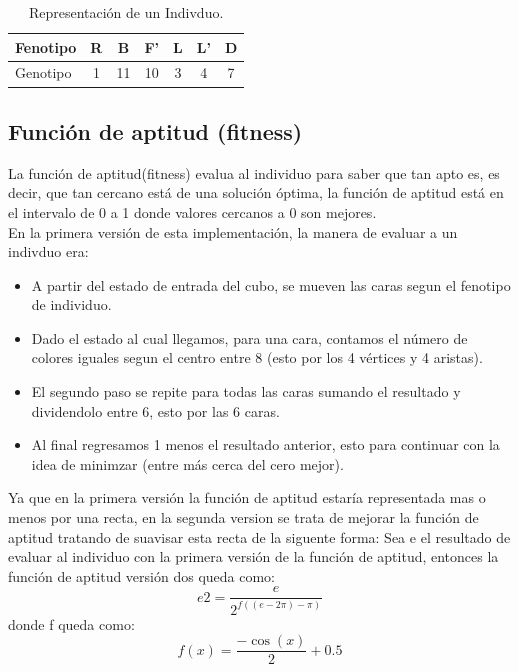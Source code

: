 \documentclass[oneside,10pt]{article}
\begin{document}
\begin{table}[htbp]
\begin{center}
\begin{tabular}{|l|c|c|c|c|c|c|}
\hline
Fenotipo & R & B & F' & L & L'& D\\
\hline
Genotipo & 1 & 11 & 10 & 3 & 4 & 7\\
\hline
\end{tabular}
\caption{Representaci\'on de un Indivduo.}
\label{tabla:individuo}
\end{center}
\end{table}

\subsection{Funci\'on de aptitud (fitness)}
La funci\'on de aptitud(fitness) evalua al individuo para saber que tan apto es, es decir, que tan cercano est\'a de una soluci\'on \'optima, la funci\'on de aptitud est\'a en el intervalo de 0 a 1 donde valores cercanos a 0 son mejores.\\

En la primera versi\'on de esta implementaci\'on, la manera de evaluar a un indivduo era:
\begin{itemize}
    \item A partir del estado de entrada del cubo, se mueven las caras segun el fenotipo de individuo. 
    \item Dado el estado al cual llegamos, para una cara,  contamos el n\'umero de colores iguales segun el centro entre 8 (esto por los 4 v\'ertices y 4 aristas).
    \item El segundo paso se repite para todas las caras sumando el resultado y dividendolo entre 6, esto por las 6 caras.
    \item Al final regresamos 1 menos el resultado anterior, esto para continuar con la idea de minimzar (entre m\'as cerca del cero mejor).
    
\end{itemize}


Ya que en la primera versi\'on la funci\'on de aptitud estar\'ia representada mas o menos por una recta, en la segunda version se trata de mejorar la funci\'on de aptitud tratando de suavisar esta recta de la siguente forma: Sea e el resultado de evaluar al individuo con la primera versi\'on de la funci\'on de aptitud, entonces la funci\'on de aptitud versi\'on dos queda como: $$e2 =\frac{e}{2^{f((e - 2\pi)-\pi)}}$$ donde f queda como: $$ f(x) = \frac{- \cos(x)}{2} + 0.5 $$   
\end{document}
